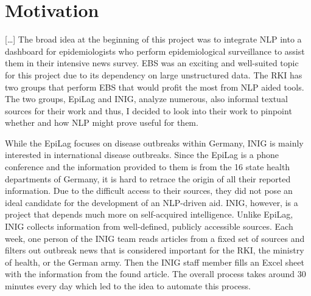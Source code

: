 
\section{Motivation}
  [\dots]
  The broad idea at the beginning of this project was to integrate NLP into a dashboard for epidemiologists who perform epidemiological surveillance to assist them in their intensive news survey.
  EBS was an exciting and well-suited topic for this project due to its dependency on large unstructured data.
  The RKI has two groups that perform EBS that would profit the most from NLP aided tools. The two groups, EpiLag and INIG, analyze numerous, also informal textual sources for their work and thus, I decided to look into their work to pinpoint whether and how NLP might prove useful for them.

  While the EpiLag focuses on disease outbreaks within Germany, INIG is mainly interested in international disease outbreaks. Since the EpiLag is a phone conference and the information provided to them is from the 16 state health departments of Germany, it is hard to retrace the origin of all their reported information.
  Due to the difficult access to their sources, they did not pose an ideal candidate for the development of an NLP-driven aid.
  INIG, however, is a project that depends much more on self-acquired intelligence.
  Unlike EpiLag, INIG collects information from well-defined, publicly accessible sources.
  Each week, one person of the INIG team reads articles from a fixed set of sources and filters out outbreak news that is considered important for the RKI, the ministry of health, or the German army.
  Then the INIG staff member fills an Excel sheet with the information from the found article.
  The overall process takes around 30 minutes every day which led to the idea to automate this process.

